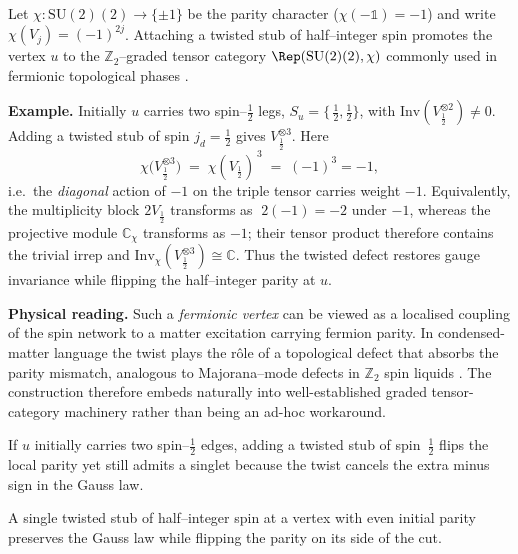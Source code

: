 \documentclass[11pt]{article}
\newcommand{\SU}{\mathrm{SU}(2)}
\newcommand{\Inv}{\mathrm{Inv}}
\begin{document}
\begin{remark}
\label{rem:twistedGauss}
Let $\chi\colon\SU(2)\!\to\!\{\pm1\}$ be the parity character
($\chi(-\mathbb 1)=-1$) and write
$\chi(V_j)=(-1)^{2j}$.  
Attaching a twisted stub of half–integer spin
promotes the vertex $u$ to the $\mathbb Z_2$–graded tensor
category $\Rep(\SU(2),\chi)$ commonly used in fermionic
topological phases \cite[Sec.\,2]{Kitaev2006}.

\medskip\noindent
\textbf{Example.}  
Initially $u$ carries two spin–$\tfrac12$ legs,
$S_u=\{\,\tfrac12,\tfrac12\}$, with 
$\Inv(V_{\tfrac12}^{\otimes2})\neq0$.
Adding a twisted stub of spin
$j_d=\tfrac12$ gives $V_{\tfrac12}^{\otimes3}$.
Here 
\[
  \chi\!\bigl(V_{\tfrac12}^{\otimes3}\bigr)
  \;=\;
  \chi(V_{\tfrac12})^{\,3}
  \;=\;
  (-1)^{3}
  =-1,
\]
i.e.\ the \emph{diagonal} action of $-1$ on the triple tensor
carries weight $-1$.  Equivalently, the multiplicity block
$2V_{\tfrac12}$ transforms as $\;2(-1)=-2$ under $-1$,
whereas the projective module
$\mathbb C_{\chi}$ transforms as $-1$;
their tensor product therefore contains the trivial irrep and
\(
\Inv_{\chi}(V_{\tfrac12}^{\otimes3})\cong\mathbb C.
\)
Thus the twisted defect restores gauge invariance while flipping the
half–integer parity at $u$.

\medskip
\textbf{Physical reading.}
Such a \emph{fermionic vertex} can be viewed as a localised coupling of
the spin network to a matter excitation carrying fermion parity.
In condensed-matter language the twist plays the rôle of a
topological defect that absorbs the parity mismatch, analogous to
Majorana–mode defects in $\mathbb Z_2$ spin liquids
\cite{GaiottoJohnson2020}.  The construction therefore embeds naturally
into well-established graded tensor-category machinery rather than being
an ad-hoc workaround.
\end{remark}

\begin{example}\label{ex:defect}
If $u$ initially carries two spin–$\tfrac12$ edges, adding a twisted stub
of spin~$\tfrac12$ flips the local parity yet still admits a singlet
because the twist cancels the extra minus sign in the Gauss law.
\end{example}

\begin{lemma}\label{lem:defectGauge}
A single twisted stub of half–integer spin at a vertex with even initial
parity preserves the Gauss law while flipping the parity on its side of
the cut.
\end{lemma}
\end{document}
